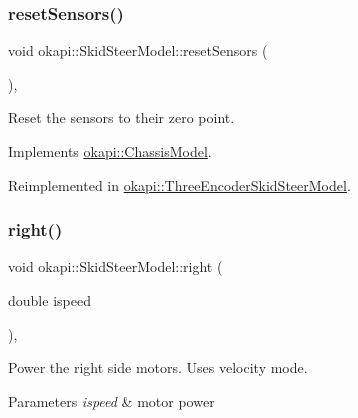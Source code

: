 \mbox{\label{classokapi_1_1SkidSteerModel_af8885fc16e654eafa872dd7c760591cf}} 
\subsubsection{\texorpdfstring{resetSensors()}{resetSensors()}}
{\footnotesize\ttfamily void okapi\+::\+Skid\+Steer\+Model\+::reset\+Sensors (\begin{DoxyParamCaption}{ }\end{DoxyParamCaption})\hspace{0.3cm}{\ttfamily [override]}, {\ttfamily [virtual]}}

Reset the sensors to their zero point. 

Implements \mbox{\hyperlink{classokapi_1_1ChassisModel_a6bd7e6bb60d41d3f1f5a5a129acfe1b6}{okapi\+::\+Chassis\+Model}}.



Reimplemented in \mbox{\hyperlink{classokapi_1_1ThreeEncoderSkidSteerModel_a6e4d43a1f3027798c0451c93f8cde057}{okapi\+::\+Three\+Encoder\+Skid\+Steer\+Model}}.

\mbox{\label{classokapi_1_1SkidSteerModel_ada9bd222b5aeaa0507b57906ac59dd3b}} 
\subsubsection{\texorpdfstring{right()}{right()}}
{\footnotesize\ttfamily void okapi\+::\+Skid\+Steer\+Model\+::right (\begin{DoxyParamCaption}\item[{double}]{ispeed }\end{DoxyParamCaption})\hspace{0.3cm}{\ttfamily [override]}, {\ttfamily [virtual]}}

Power the right side motors. Uses velocity mode.


\begin{DoxyParams}{Parameters}
{\em ispeed} & motor power \\
\hline
\end{DoxyParams}


